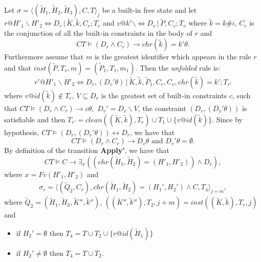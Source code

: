 \documentclass[final]{acmtrans2e}
\newcommand{\la}{\langle}
\newcommand{\ra}{\rangle}
\begin{document}
 Let  $\sigma=\la (\tilde H_1,\tilde H_2,\tilde H_3) , C, T\ra_j$ be a built-in free state
and let
$r@H'_1\backslash H'_2 \Leftrightarrow  D_r\,|\,\tilde K, \tilde k, C_r; T_r $ and
$v@k'\backslash \Leftrightarrow  D_v\,|\, \tilde P, C_v;T_v$
where $\tilde k = k\#i$, $C_r$ is the conjunction of all the built-in constraints in the body
of $r$ and
\begin{equation}\label{113marzo1}
    CT \models (D_r \wedge C_r) \rightarrow chr(\tilde k)=k'\theta.
\end{equation}
Furthermore assume that $m$ is the greatest identifier which appears in the
rule $r$ and that $inst(\tilde P, T_v,m)=(\tilde P_1, T_1, m_1)$.
Then the \emph{unfolded} rule is:
\[
    r'@ H'_1\backslash H'_2
\Leftrightarrow D_r, (D_v'\theta)\, |\, \tilde K,\tilde k,\tilde
P_1, C_r, C_v, chr(\tilde k)= k'; T_{r'}
\]
where $v @id (\tilde k) \not \in T_r$,
$V\subseteq D_v$ is the greatest set of built-in constraints $c$,
such that
$CT \models (D_r\wedge C_r)\rightarrow c\theta,$
$D_v'= D_v\backslash V$, the
constraint $(D_r, (D_v'\theta))$ is satisfiable and
 then $T_{r'}=clean((\tilde K,\tilde k) ,  T_r) \cup T_1 \cup
              \{v @id (\tilde k)\}$.
 Since by hypothesis, $CT \models (D_r, (D_v'\theta))\leftrightarrow D_r$, we have that
    \begin{equation}\label{110dic2}
    CT \models (D_r\wedge C_r)\rightarrow D_v\theta \mbox{ and } D_v'\theta=\emptyset.
\end{equation}
 By definition of the transition \textbf{Apply'}, we have that
\begin{equation}\label{110dic1}
    CT\models C\rightarrow \exists_x((chr(\tilde H_1,
\tilde H_2)=(H'_1, H'_2))\wedge D_r),
\end{equation}
where $ x=Fv(H'_1,H'_2)$ and
$$\begin{array}{l}
    \sigma_{r}=\la (\tilde Q_2, C_r),
          chr(\tilde H_1, \tilde H_2)= (H_1', H_2')\wedge C, T_4\ra_{j+m},
  \end{array}
  $$
     where $\tilde Q_2=(\tilde H_1,\tilde H_3,\tilde K'',\tilde k'')$,
     $((\tilde K'',\tilde k''), T_2, j+m) = inst ((\tilde K,\tilde k), T_r, j)$ and
\begin{itemize}
    \item if $H_2'=\emptyset$ then $T_4=T \cup T_2 \cup\{r @id (\tilde H_1)\}$
    \item if $H_2'\not =\emptyset$ then $T_4=T \cup T_2$.
    \end{itemize}
\end{document}
